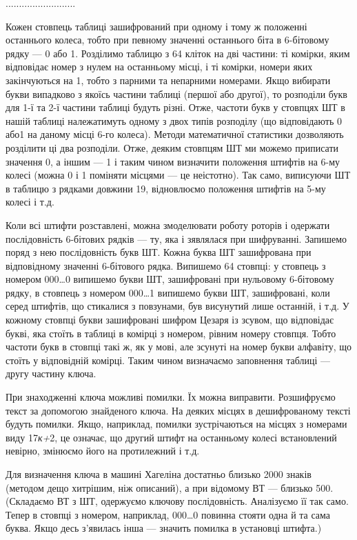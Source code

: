 {\centering
..........................
\par}

Кожен стовпець таблиці зашифрований при одному і тому ж положенні останнього
колеса, тобто при певному значенні останнього біта в 6-бітовому рядку --- 0 або
1. Розділимо таблицю з 64 кліток на дві частини: ті комірки, яким відповідає
номер з нулем на останньому місці, і ті комірки, номери яких закінчуються на 1,
тобто з парними та непарними номерами. Якщо вибирати букви випадково з якоїсь
частини таблиці (першої або другої), то розподіли букв для 1-ї та 2-ї частини
таблиці будуть різні. Отже, частоти букв у стовпцях ШТ в нашій таблиці
належатимуть одному з двох типів розподілу (що відповідають 0 або1 на даному
місці 6-го колеса). Методи математичної статистики дозволяють розділити ці два
розподіли. Отже, деяким стовпцям ШТ ми можемо приписати значення 0, а іншим --- 1
і таким чином визначити положення штифтів на 6-му колесі (можна 0 і 1 поміняти
місцями --- це неістотно). Так само, виписуючи ШТ в таблицю з рядками довжини 19,
відновлюємо положення штифтів на 5-му колесі і т.д.

Коли всі штифти розставлені, можна змоделювати роботу роторів і одержати
послідовність 6-бітових рядків --- ту, яка і з{\textquotesingle}являлася при
шифруванні. Запишемо поряд з нею послідовність букв ШТ. Кожна буква ШТ
зашифрована при відповідному значенні 6-бітового рядка. Випишемо 64 стовпці: у
стовпець з номером 000…0 випишемо букви ШТ, зашифровані при нульовому
6-бітовому рядку, в стовпець з номером 000…1 випишемо букви ШТ, зашифровані,
коли серед штифтів, що стикалися з повзунами, був висунутий лише останній, і
т.д. У кожному стовпці букви зашифровані шифром Цезаря із зсувом, що відповідає
букві, яка стоїть в таблиці  в комірці з номером, рівним номеру стовпця. Тобто
частоти букв в стовпці такі ж, як у мові, але зсунуті на номер букви алфавіту,
що стоїть у відповідній комірці. Таким чином визначаємо заповнення таблиці ---
другу частину ключа.

При знаходженні ключа можливі помилки. Їх можна виправити. Розшифруємо текст за
допомогою знайденого ключа. На деяких місцях в дешифрованому тексті будуть
помилки. Якщо, наприклад, помилки зустрічаються на місцях з номерами виду 
17\textit{к+}2, це означає, що другий штифт на останньому колесі встановлений
невірно, змінюємо його на протилежний і т.д.

Для визначення ключа в машині Хагеліна достатньо близько 2000 знаків (методом
дещо хитрішим, ніж описаний), а при відомому ВТ --- близько 500. (Складаємо ВТ з
ШТ, одержуємо ключову послідовність. Аналізуємо її так само. Тепер в стовпці з
номером, наприклад, 000…0 повинна стояти одна й та сама буква. Якщо десь
з’явилась інша --- значить помилка в установці штифта.)

